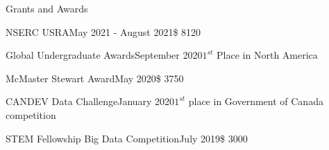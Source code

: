 \begin{rSection}{Grants and Awards} 

\begin{aSubsection}{NSERC USRA}{May 2021 - August 2021}{\$ 8120}{}
\end{aSubsection}

\begin{aSubsection}{Global Undergraduate Awards}{September 2020}{$1^{st}$ Place in North America}{}
\end{aSubsection}

\begin{aSubsection}{McMaster Stewart Award}{May 2020}{\$ 3750}{}
\end{aSubsection}

\begin{aSubsection}{CANDEV Data Challenge}{January 2020}{$1^{st}$ place in Government of Canada competition}{}
\end{aSubsection}

\begin{aSubsection}{STEM Fellowship Big Data Competition}{July 2019}{\$ 3000}{}
\end{aSubsection}


\end{rSection}

